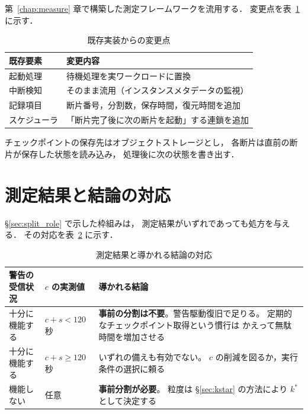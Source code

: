 \documentclass[11pt,a4paper]{ltjsreport}
\begin{document}
第~\ref{chap:measure} 章で構築した測定フレームワークを流用する．
変更点を表~\ref{tab:impl} に示す．

\begin{table}[htbp]
\centering
\caption{既存実装からの変更点}
\label{tab:impl}
\small
\begin{tabularx}{\textwidth}{@{}lX@{}}
\toprule
既存要素 & 変更内容 \\
\midrule
起動処理 & 待機処理を実ワークロードに置換 \\
中断検知 & そのまま流用（インスタンスメタデータの監視） \\
記録項目 & 断片番号，分割数，保存時間，復元時間を追加 \\
スケジューラ & 「断片完了後に次の断片を起動」する連鎖を追加 \\
\bottomrule
\end{tabularx}
\end{table}

チェックポイントの保存先はオブジェクトストレージとし，
各断片は直前の断片が保存した状態を読み込み，
処理後に次の状態を書き出す．

\section{測定結果と結論の対応}
\label{sec:outcome_map}

\S\ref{sec:split_role} で示した枠組みは，
測定結果がいずれであっても処方を与える．
その対応を表~\ref{tab:outcome_map} に示す．

\begin{table}[htbp]
\centering
\caption{測定結果と導かれる結論の対応}
\label{tab:outcome_map}
\small
\begin{tabularx}{\textwidth}{@{}llX@{}}
\toprule
警告の受信状況 & $c$ の実測値 & 導かれる結論 \\
\midrule
十分に機能する & $c + s < 120$ 秒
  & \textbf{事前の分割は不要}。警告駆動復旧で足りる。
    定期的なチェックポイント取得という慣行は
    かえって無駄時間を増加させる \\
\addlinespace
十分に機能する & $c + s \geq 120$ 秒
  & いずれの備えも有効でない。
    $c$ の削減を図るか，実行条件の選択に頼る \\
\addlinespace
機能しない & 任意
  & \textbf{事前分割が必要}。
    粒度は \S\ref{sec:kstar} の方法により $k^{*}$ として決定する \\
\bottomrule
\end{tabularx}
\end{table}
\end{document}

